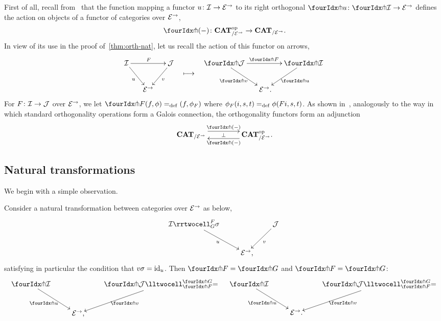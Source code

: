 \documentclass[reqno,10pt,a4paper,oneside,draft]{amsart}
\begin{document}
First of all, recall from~\cite{garner:small-object-argument} that the function mapping a functor $u \colon \mathcal{I} \to \mathcal{E}^\to$ to its right orthogonal $\liftr{u} \co \liftr{\cal{I}} \to \catE^\to$ defines the action on objects of a functor of categories over $\mathcal{E}^\to$,
\[
  \liftr{\brarghole} \co \CAT_{/\catE^\to}^{\op} \to \CAT_{/\catE^\to} \rlap{.}
\]
In view of its use in the proof of~\cref{thm:orth-nat}, let us recall the action of this functor on arrows,
\[
\begin{aligned}
\xymatrix@C-1em{
  \cal{I}
  \ar[dr]_{u}
  \ar[rr]^{F}
&&
  \cal{J}
  \ar[dl]^{v}
\\&
  \catE^\to
}
&&
\xymatrix{
  \ar@{}[d]|{\textstyle\longmapsto} \\
  {}
}
&&
\xymatrix@C-1em{
  \liftr{\cal{J}}
  \ar[dr]_{\liftr{v}}
  \ar[rr]^{\liftr{F}}
&&
  \liftr{\cal{I}}
  \ar[dl]^{\liftr{u}}
\\&
  \catE^\to \rlap{.}
}
\end{aligned}
\]
For $F \colon \mathcal{I} \to \mathcal{J}$ over $\mathcal{E}^\to$, we let $\liftr{F}(f,\phi) \defeq (f, \phi_F)$ where $\phi_F(i, s, t) =_{\operatorname{def}} \phi(Fi, s, t)$.
As shown in~\cite[Proposition~3.8]{garner:small-object-argument}, analogously to the way in which standard orthogonality operations form a Galois connection, the orthogonality functors form an adjunction
\begin{equation} \label{garner-adjunction}
\begin{gathered}
\xymatrix@C+2em{
  \CAT_{/\catE^\to}
  \ar@<5pt>[r]^-{\liftl{\brarghole}}
  \ar@{}[r]|-{\bot}
&
  \CAT_{/\catE^\to}^{\op} \rlap{.}
  \ar@<5pt>[l]^-{\liftr{\brarghole}}
}
\end{gathered}
\end{equation}

\subsection*{Natural transformations}

We begin with a simple observation.

\begin{proposition} \label{thm:orth-nat}
Consider a natural transformation between categories over $\mathcal{E}^\to$ as below,
\[
\xymatrix{
  \cal{I}
  \rrtwocell_G^F{\sigma}
 \ar[dr]_{u}
&&
  \cal{J}
  \ar[dl]^{v}
\\&
  \catE^\to
\rlap{,}}
\]
satisfying in particular the condition that $v \sigma = \operatorname{id}_u$.
Then $\liftr{F} = \liftr{G}$ and $\liftl{F} = \liftl{G}$:
\begin{align*}
\xymatrix{
  \liftr{\cal{I}}
  \ar[dr]_{\liftr{u}}
&&
  \liftr{\cal{J}}
  \lltwocell_{\liftr{F}}^{\liftr{G}}{=}
  \ar[dl]^{\liftr{v}}
\\&
  \catE^\to
\rlap{,}}
&&
\xymatrix{
  \liftl{\cal{I}}
  \ar[dr]_{\liftl{u}}
&&
  \liftl{\cal{J}}
  \lltwocell_{\liftl{F}}^{\liftl{G}}{=}
  \ar[dl]^{\liftl{v}}
\\&
  \catE^\to
\rlap{.}}
\end{align*}
\end{proposition}
\end{document}

